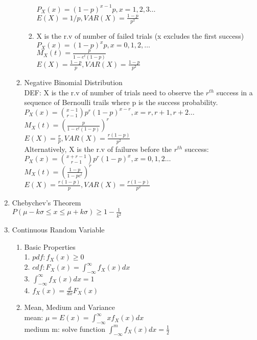 \documentclass[10pt]{article}
\begin{document}
\begin{multicols}{2}
\begin{enumerate}
\begin{enumerate}
\begin{enumerate}
					$P_X(x) = (1-p)^{x-1}p, x = 1,2,3 \dots$\\
					$E(X) = 1/p, VAR(X) = \frac{1-p}{p^2}$
					\item X is the r.v of number of failed trials (x excludes the first success)\\
					$P_X(x) = (1-p)^xp, x = 0,1,2,\dots$\\
					$M_X(t) = \frac{p}{1-e^t(1-p)}$\\
					$E(X) = \frac{1-p}{p}, VAR(X) = \frac{1-p}{p^2}$
				\end{enumerate}
				\item Negative Binomial Distribution\\
					DEF: X is the r.v of number of trials need to observe the $r^{th}$ success in a sequence of Bernoulli trails where p is the success probability.\\
					$P_X(x) = {x-1 \choose r-1}p^r(1-p)^{x-r}, x = r,r+1,r+2 \dots$\\
					$M_X(t) = (\frac{p}{1-e^t(1-p)})^r$\\
					$E(X) = \frac{r}{p}, VAR(X) = \frac{r(1-p)}{p^2}$\\
					Alternatively, X is the r.v of failures before the $r^{th}$ success:\\
					$P_X(x) = {x+r-1 \choose r-1}p^r(1-p)^x, x = 0,1,2 \dots$\\
					$M_X(t) = (\frac{1-p}{1-pe^t})^r$\\
					$E(X) = \frac{r(1-p)}{p}, VAR(X) = \frac{r(1-p)}{p^2}$\\
			\end{enumerate}
			\item Chebychev's Theorem\\
			$P(\mu-k\sigma \le x \le \mu+k\sigma) \ge 1-\frac{1}{k^2}$
			\item Continuous Random Variable
			\begin{enumerate}
				\item Basic Properties\\
				1. $pdf: f_X(x) \ge 0$\\
				2. $cdf: F_X(x) = \int_{-\infty}^{\infty} f_X(x)dx$\\
				3. $\int_{-\infty}^{\infty}f_X(x)dx = 1$\\
				4. $f_X(x) = \frac{d}{dx}F_X(x)$
				\item Mean, Medium and Variance\\
				mean: $\mu = E(x) = \int_{-\infty}^{\infty}xf_X(x)dx$\\
				medium m: solve function $\int_{-\infty}^{m} f_X(x)dx = \frac{1}{2}$\\

\end{enumerate}
\end{enumerate}
\end{multicols}
\end{document}
